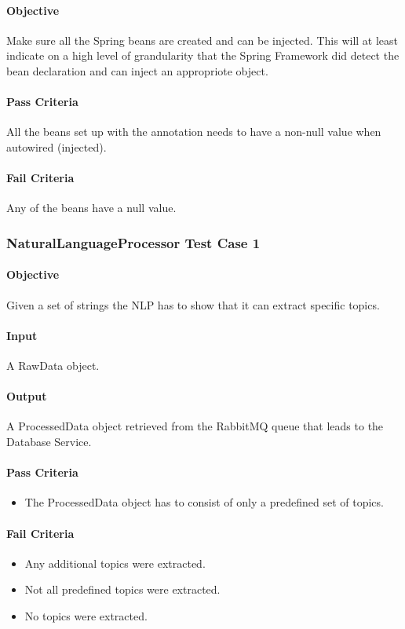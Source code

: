 \documentclass[hidelinks,english]{article}
\begin{document}
				\paragraph{Objective} Make sure all the Spring beans are created and can be injected. This will at least indicate on a high level of grandularity that the Spring Framework did detect the bean declaration and can inject an appropriote object.
				\paragraph{Pass Criteria} All the beans set up with the \emph{\@Bean} annotation needs to have a non-null value when autowired (injected).
				\paragraph{Fail Criteria} Any of the beans have a null value.
				
			\subsubsection{NaturalLanguageProcessor Test Case 1}\label{pprocessortopictest1}
				\paragraph{Objective} Given a set of strings the NLP has to show that it can extract specific topics.
				\paragraph{Input} A RawData object.
				\paragraph{Output} A ProcessedData object retrieved from the RabbitMQ queue that leads to the Database Service.
				\paragraph{Pass Criteria}
				\begin{itemize}
					\item The ProcessedData object has to consist of only a predefined set of topics.
				\end{itemize}
				\paragraph{Fail Criteria}
				\begin{itemize}
					\item Any additional topics were extracted.
					\item Not all predefined topics were extracted.
					\item No topics were extracted.
				\end{itemize}
				
\end{document}
